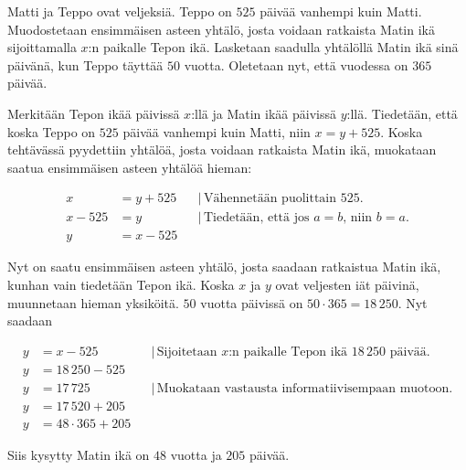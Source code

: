 
\begin{esimerkki} 
Matti ja Teppo ovat veljeksiä. Teppo on $525$ päivää vanhempi kuin Matti. Muodostetaan ensimmäisen asteen yhtälö, josta voidaan ratkaista Matin ikä sijoittamalla $x$:n paikalle Tepon ikä. Lasketaan saadulla yhtälöllä Matin ikä sinä päivänä, kun Teppo täyttää $50$ vuotta. Oletetaan nyt, että vuodessa on $365$ päivää.

Merkitään Tepon ikää päivissä $x$:llä ja Matin ikää päivissä $y$:llä. Tiedetään, että koska Teppo on $525$ päivää vanhempi kuin Matti, niin $x=y+525$. Koska tehtävässä pyydettiin yhtälöä, josta voidaan ratkaista Matin ikä, muokataan saatua ensimmäisen asteen yhtälöä hieman:

      \begin{align*}
	   x &= y+525 & &| \, \text{Vähennetään puolittain 525.} \\
	   x-525 &= y & &| \, \text{Tiedetään, että jos $a=b$, niin $b=a$.} \\
	   y &= x-525 & &
      \end{align*}
      
Nyt on saatu ensimmäisen asteen yhtälö, josta saadaan ratkaistua Matin ikä, kunhan vain tiedetään Tepon ikä. Koska $x$ ja $y$ ovat veljesten iät päivinä, muunnetaan hieman yksiköitä. $50$ vuotta päivissä on $50 \cdot 365 = 18\,250$. Nyt saadaan

      \begin{align*}
	  y &= x-525 & &| \, \text{Sijoitetaan $x$:n paikalle Tepon ikä $18\,250$ päivää.} \\
	  y &= 18\,250-525 & & \\
	  y &= 17\,725 & &| \, \text{Muokataan vastausta informatiivisempaan muotoon.} \\
	  y &= 17\,520+205 & & \\
	  y &= 48 \cdot 365 +205 & &
      \end{align*}
      
      Siis kysytty Matin ikä on $48$ vuotta ja $205$ päivää.
  
\end{esimerkki}


